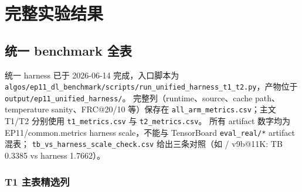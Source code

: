 \section{完整实验结果}

\subsection{统一 benchmark 全表}

统一 harness 已于 2026-06-14 完成，入口脚本为 \texttt{algos/ep11\_dl\_benchmark/scripts/run\_unified\_harness\_t1\_t2.py}，产物位于 \texttt{output/ep11\_unified\_harness/}。
完整列（runtime、source、cache path、temperature sanity、FRC@20/10 等）保存在 \texttt{all\_arm\_metrics.csv}；主文 T1/T2 分别使用 \texttt{t1\_metrics.csv} 与 \texttt{t2\_metrics.csv}。
所有 artifact 数字均为 EP11/common.metrics harness scale，不能与 TensorBoard \texttt{eval\_real/*} artifact 混表；
\texttt{tb\_vs\_harness\_scale\_check.csv} 给出三条对照（如  / v9b@11K: TB 0.3385 vs harness 1.7662）。

\subsubsection{T1 主表精选列}

